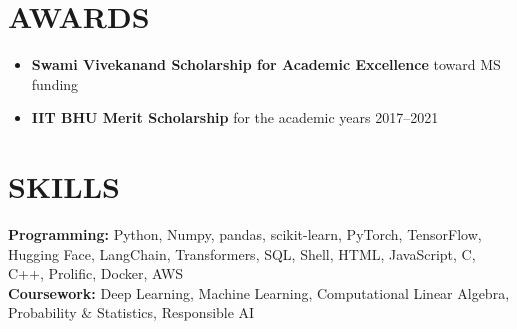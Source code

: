 \documentclass[a4paper,11pt]{article}
\begin{document}
{\vspace{-0.4cm}
\vspace{-0.2cm}
\section*{AWARDS}

\begin{itemize}
    \item {\color{boldcolor}\textbf{Swami Vivekanand Scholarship for Academic Excellence}} toward MS funding
    \item {\color{boldcolor}\textbf{IIT BHU Merit Scholarship}} for the academic years 2017–2021
\end{itemize}

\section*{SKILLS} {\color{boldcolor}\textbf{Programming:}} Python, Numpy, pandas, scikit-learn, PyTorch, TensorFlow, Hugging Face, LangChain, Transformers, SQL, Shell, HTML, JavaScript, C, C++, Prolific, Docker, AWS \\ {\color{boldcolor}\textbf{Coursework:}} Deep Learning, Machine Learning, Computational Linear Algebra, Probability \& Statistics, Responsible AI}\\ 
\end{document}
